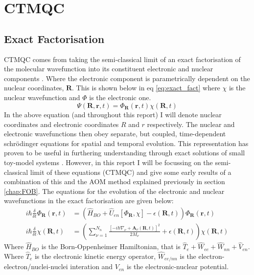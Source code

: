 
\chapter{CTMQC}
\label{chap:CTMQC}


\section{Exact Factorisation}
CTMQC comes from taking the semi-classical limit of an exact factorisation of the molecular wavefunction into its constituent electronic and nuclear components \cite{abedi_exact_2010}. Where the electronic component is parametrically dependent on the nuclear coordinates, $\textbf{R}$. This is shown below in eq \eqref{eq:exact_fact} where $\chi$ is the nuclear wavefunction and $\Phi$ is the electronic one.
\begin{equation}
 \Psi(\textbf{R}, \textbf{r}, t) = \Phi_{\textbf{R}}(\textbf{r}, t) \chi(\textbf{R}, t)
 \label{eq:exact_fact}
 \end{equation}
In the above equation (and throughout this report) I will denote nuclear coordinates and electronic coordinates $R$ and $r$ respectively. The nuclear and electronic wavefunctions then obey separate, but coupled, time-dependent schr\"odinger equations for spatial and temporal evolution. This representation has proven to be useful in furthering understanding through exact solutions of small toy-model systems \cite{agostini_quantum-classical_2016, gossel_coupled-trajectory_2018}. However, in this report I will be focussing on the semi-classical limit of these equations (CTMQC) and give some early results of a combination of this and the AOM method explained previously in section \ref{chap:FOB}.
The equations for the evolution of the electronic and nuclear wavefunctions in the exact factorisation \cite{abedi_exact_2010} are given below:
\begin{align}
  i\hbar \frac{\delta}{\delta t} \Phi_{\textbf{R}}(\textbf{r}, t) &= \left( \hat{H}_{BO} + \hat{U}_{en}\left[ \Phi_{\textbf{R}}, \chi\right] - \epsilon(\textbf{R}, t) \right) \Phi_{\textbf{R}} (\textbf{r}, t)
  \label{eq:electronic_exact}
\\
i\hbar \frac{\delta}{\delta t} \chi (\textbf{R}, t) &= \left( \sum_{\nu = 1}^{N_{n}} \frac{[-i\hbar\nabla_{\nu} + \textbf{A}_{\nu}(\textbf{R}, t)]^2}{2 M_{\nu}} + \epsilon(\textbf{R}, t)\right) \chi (\textbf{R}, t)
  \label{eq:nuclear_exact}
\end{align}
Where $\hat{H}_{BO}$ is the Born-Oppenheimer Hamiltonian, that is $\hat{T}_{e} + \hat{W}_{ee} + \hat{W}_{nn} + \hat{V}_{en}$. Where $\hat{T}_{e}$ is the electronic kinetic energy operator, $\hat{W}_{ee/nn}$ is the electron-electron/nuclei-nuclei interation and $V_{en}$ is the electronic-nuclear potential.
